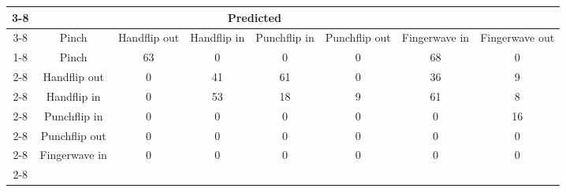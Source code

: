 \documentclass{standalone}
\begin{document}
 
 \begin{tabular}{|c |c |c |c |c |c |c |c |}
\cline{3-8}\multicolumn{2}{c|}{} & \multicolumn{6}{c|}{Predicted} \\ 
\cline{3-8} \multicolumn{2}{c |}{ } & Pinch & Handflip out & Handflip in & Punchflip in & Punchflip out & Fingerwave in & Fingerwave out\\ 
\cline{1-8}\multirow{6}{*}{\rotatebox[origin=c]{90}{Actual}} & Pinch & 63 & 0 & 0 & 0 & 68 & 0\\ 
 \cline{2-8} & Handflip out & 0 & 41 & 61 & 0 & 36 & 9\\ 
 \cline{2-8} & Handflip in & 0 & 53 & 18 & 9 & 61 & 8\\ 
 \cline{2-8} & Punchflip in & 0 & 0 & 0 & 0 & 0 & 16\\ 
 \cline{2-8} & Punchflip out & 0 & 0 & 0 & 0 & 0 & 0\\ 
 \cline{2-8} & Fingerwave in & 0 & 0 & 0 & 0 & 0 & 0\\ 
 \cline{2-8}\hline \end{tabular}
 
\end{document}
